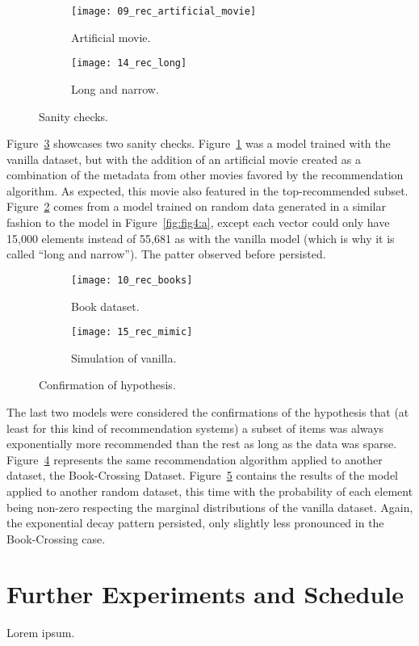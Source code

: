 \begin{figure}
  \centering
  \begin{subfigure}{0.45\textwidth}
    \centering
    \texttt{[image: 09\_rec\_artificial\_movie]}
    \caption{Artificial movie.\label{fig:fig5:a}}
  \end{subfigure}
  \begin{subfigure}{0.45\textwidth}
    \centering
    \texttt{[image: 14\_rec\_long]}
    \caption{Long and narrow.\label{fig:fig5:b}}
  \end{subfigure}
  \caption{Sanity checks.\label{fig:fig5}}
\end{figure}

Figure~\ref{fig:fig5} showcases two sanity checks. Figure~\ref{fig:fig5:a} was a
model trained with the vanilla dataset, but with the addition of an artificial
movie created as a combination of the metadata from other movies favored by the
recommendation algorithm. As expected, this movie also featured in the
top-recommended subset. Figure~\ref{fig:fig5:b} comes from a model trained on
random data generated in a similar fashion to the model in
Figure~\ref{fig:fig4:a}, except each vector could only have 15,000 elements
instead of 55,681 as with the vanilla model (which is why it is called ``long
and narrow''). The patter observed before persisted.

\begin{figure}
  \centering
  \begin{subfigure}{0.45\textwidth}
    \centering
    \texttt{[image: 10\_rec\_books]}
    \caption{Book dataset.\label{fig:fig6:a}}
  \end{subfigure}
  \begin{subfigure}{0.45\textwidth}
    \centering
    \texttt{[image: 15\_rec\_mimic]}
    \caption{Simulation of vanilla.\label{fig:fig6:b}}
  \end{subfigure}
  \caption{Confirmation of hypothesis.\label{fig:fig6}}
\end{figure}

The last two models were considered the confirmations of the hypothesis that
(at least for this kind of recommendation systems) a subset of items was always
exponentially more recommended than the rest as long as the data was sparse.
Figure~\ref{fig:fig6:a} represents the same recommendation algorithm applied to
another dataset, the Book-Crossing Dataset. Figure~\ref{fig:fig6:b} contains the
results of the model applied to another random dataset, this time with the
probability of each element being non-zero respecting the marginal distributions
of the vanilla dataset. Again, the exponential decay pattern persisted, only
slightly less pronounced in the Book-Crossing case.

\section{Further Experiments and Schedule}
\label{sec:schedule}

Lorem ipsum.
